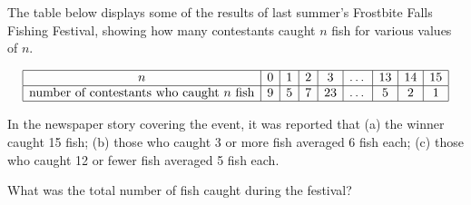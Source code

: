 The table below displays some of the results of last summer's Frostbite Falls Fishing Festival, showing how many contestants caught $n$ fish for various values of $n$.

\[ \begin{array}{|c|c|c|c|c|c|c|c|c|} \hline n & 0 & 1 & 2 & 3 & \dots & 13 & 14 & 15 \\ \hline \text{number of contestants who caught} \ n \ \text{fish} & 9 & 5 & 7 & 23 & \dots & 5 & 2 & 1 \\ \hline \end{array}  \]

In the newspaper story covering the event, it was reported that
(a) the winner caught 15 fish;
(b) those who caught 3 or more fish averaged 6 fish each;
(c) those who caught 12 or fewer fish averaged 5 fish each.

What was the total number of fish caught during the festival?